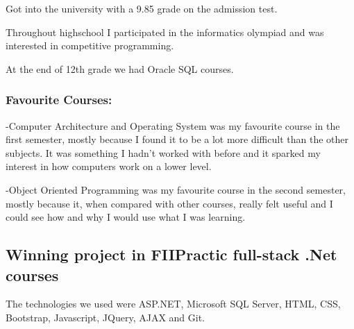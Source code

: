 \documentclass[a4paper,hidelinks,12pt]{article}
\begin{document}
Got into the university with a 9.85 grade on the admission test.

Throughout highschool I participated in the informatics olympiad and was interested in competitive programming.

At the end of 12th grade we had Oracle SQL courses.
 
 \subsubsection{Favourite Courses:} 
 -Computer Architecture and Operating System was my favourite course in the first semester, mostly because I 
 found it to be a lot more difficult than the other subjects. It was something I hadn't worked with before
 and it sparked my interest in how computers work on a lower level.

 -Object Oriented Programming was my favourite course in the second semester, mostly because it, when compared
 with other courses, really felt useful and I could see how and why I would use what I was learning.


\subsection{Winning project in FIIPractic full-stack .Net courses}

The technologies we used were ASP.NET, Microsoft SQL Server, HTML, CSS, Bootstrap, Javascript, JQuery, AJAX and Git. 
\end{document}
